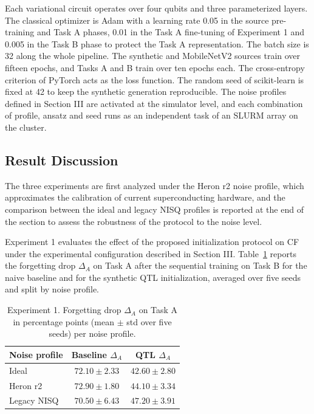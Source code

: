 \documentclass[conference]{IEEEtran}
\begin{document}
Each variational circuit operates over four qubits and three parameterized layers. The classical optimizer is Adam with a learning rate 0.05 in the source pre-training and Task A phases, 0.01 in the Task A fine-tuning of Experiment 1 and 0.005 in the Task B phase to protect the Task A representation. The batch size is 32 along the whole pipeline. The synthetic and MobileNetV2 sources train over fifteen epochs, and Tasks A and B train over ten epochs each. The cross-entropy criterion of PyTorch acts as the loss function. The random seed of scikit-learn is fixed at 42 to keep the synthetic generation reproducible. The noise profiles defined in Section III are activated at the simulator level, and each combination of profile, ansatz and seed runs as an independent task of an SLURM array on the cluster.

\subsection{Result Discussion}
The three experiments are first analyzed under the Heron r2 noise profile, which approximates the calibration of current superconducting hardware, and the comparison between the ideal and legacy NISQ profiles is reported at the end of the section to assess the robustness of the protocol to the noise level.

Experiment 1 evaluates the effect of the proposed initialization protocol on CF under the experimental configuration described in Section III. Table~\ref{tab:exp1} reports the forgetting drop $\Delta_A$ on Task A after the sequential training on Task B for the naive baseline and for the synthetic QTL initialization, averaged over five seeds and split by noise profile.

\begin{table}[ht]
\caption{Experiment 1. Forgetting drop $\Delta_A$ on Task A in percentage points (mean $\pm$ std over five seeds) per noise profile.}
\label{tab:exp1}
\centering
\begin{tabular}{lcc}
\toprule
Noise profile & Baseline $\Delta_A$ & QTL $\Delta_A$ \\
\midrule
Ideal & $72.10 \pm 2.33$ & $42.60 \pm 2.80$ \\
Heron r2 & $72.90 \pm 1.80$ & $44.10 \pm 3.34$ \\
Legacy NISQ & $70.50 \pm 6.43$ & $47.20 \pm 3.91$ \\
\bottomrule
\end{tabular}
\end{table}
\end{document}
